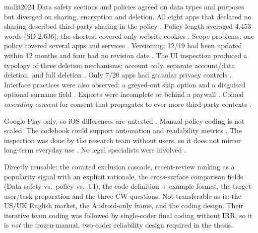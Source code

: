 \begin{papercard}{malki2024}
 Data safety sections and policies agreed on data types and purposes but diverged on sharing, encryption and deletion. All eight apps that declared no sharing described third-party sharing in the policy . Policy length averaged 4{,}453 words (SD 2{,}636); the shortest covered only website cookies . Scope problems: one policy covered several apps and services . Versioning: 12/19 had been updated within 12 months and four had no revision date . The UI inspection produced a typology of three deletion mechanisms: account only, separate account/data deletion, and full deletion . Only 7/20 apps had granular privacy controls . Interface practices were also observed: a greyed-out skip option and a disguised optional surname field . Exports were incomplete or behind a paywall . Coined \emph{cascading consent} for consent that propagates to ever more third-party contexts .

 Google Play only, so iOS differences are untested . Manual policy coding is not scaled. The codebook could support automation and readability metrics . The inspection was done by the research team without users, so it does not mirror long-term everyday use . No legal specialists were involved .

 Directly reusable: the counted exclusion cascade, recent-review ranking as a popularity signal with an explicit rationale, the cross-surface comparison fields (Data safety vs.\ policy vs.\ UI), the code definition + example format, the target-user/task preparation and the three CW questions. Not transferable as-is: the US/UK English market, the Android-only frame, and the coding design. Their iterative team coding was followed by single-coder final coding without IRR, so it is \emph{not} the frozen-manual, two-coder reliability design required in the thesis.
\end{papercard}

